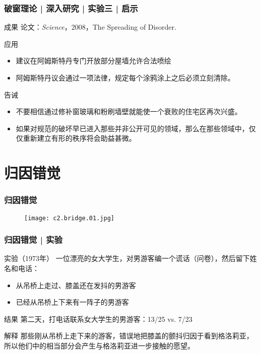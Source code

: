 \begin{frame}
  \frametitle{破窗理论 | 深入研究 | 实验三 | 启示}
  \begin{block}{成果}
    论文：\textit{Science}，2008，The Spreading of Disorder.
  \end{block}
  \pause
  \begin{block}{应用}
    \begin{itemize}
      \item 建议在阿姆斯特丹专门开放部分屋墙允许合法喷绘
      \item 阿姆斯特丹议会通过一项法律，规定每个涂鸦涂上之后必须立刻清除。
    \end{itemize}
  \end{block}
  \pause
  \begin{block}{告诫}
    \begin{itemize}
       \item  不要相信通过修补窗玻璃和粉刷墙壁就能使一个衰败的住宅区再次兴盛。
       \item 如果对规范的破坏早已进入那些并非公开可见的领域，那么在那些领域中，仅仅重新建立有形的秩序将会助益甚微。
    \end{itemize}
  \end{block}
\end{frame}

\section{归因错觉}
\begin{frame}
  \frametitle{归因错觉}
  \begin{figure}
    \centering
    \texttt{[image: c2.bridge.01.jpg]}
  \end{figure}
\end{frame}

\begin{frame}
  \frametitle{归因错觉 | 实验}
  \begin{block}{实验（1973年）}
    一位漂亮的女大学生，对男游客编一个谎话（问卷），然后留下姓名和电话：
    \begin{itemize}
      \item 从吊桥上走过、膝盖还在发抖的男游客
      \item 已经从吊桥上下来有一阵子的男游客
    \end{itemize}
  \end{block}
  \pause
  \begin{block}{结果}
    第二天，打电话联系女大学生的男游客：13/25 vs. 7/23
  \end{block}
  \pause
  \begin{block}{解释}
那些刚从吊桥上走下来的游客，错误地把膝盖的颤抖归因于看到格洛莉亚，所以他们中的相当部分会产生与格洛莉亚进一步接触的愿望。
  \end{block}
\end{frame}

